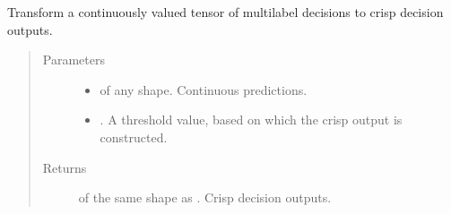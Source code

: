 \documentclass[letterpaper,10pt,english]{sphinxmanual}
\begin{document}
\begin{fulllineitems}
\label{\detokenize{pusion.util.transformer:pusion.util.transformer.multilabel_predictions_to_decisions}}
\sphinxAtStartPar
Transform a continuously valued tensor of multilabel decisions to crisp decision outputs.
\begin{quote}\begin{description}
\item[{Parameters}] \leavevmode\begin{itemize}
\item {} 
\sphinxAtStartPar
{} \textendash{}  of any shape. Continuous predictions.

\item {} 
\sphinxAtStartPar
{} \textendash{} . A threshold value, based on which the crisp output is constructed.

\end{itemize}

\item[{Returns}] \leavevmode
\sphinxAtStartPar
{} of the same shape as . Crisp decision outputs.

\end{description}\end{quote}

\end{fulllineitems}

\end{document}
